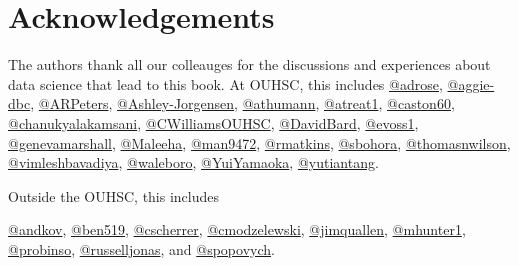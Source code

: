 \documentclass[
]{book}
\begin{document}
\hypertarget{acknowledgements}{%
\chapter{Acknowledgements}\label{acknowledgements}}

The authors thank all our colleauges for the discussions and experiences about data science that lead to this book. At OUHSC, this includes
\href{https://github.com/adrose}{@adrose},
\href{https://github.com/aggie-dbc}{@aggie-dbc},
\href{https://github.com/ARPeters}{@ARPeters},
\href{https://github.com/Ashley-Jorgensen}{@Ashley-Jorgensen},
\href{https://github.com/athumann}{@athumann},
\href{https://github.com/atreat1}{@atreat1},
\href{https://github.com/caston60}{@caston60},
\href{https://github.com/chanukyalakamsani}{@chanukyalakamsani},
\href{https://github.com/CWilliamsOUHSC}{@CWilliamsOUHSC},
\href{https://github.com/DavidBard}{@DavidBard},
\href{https://github.com/evoss1}{@evoss1},
\href{https://github.com/genevamarshall}{@genevamarshall},
\href{https://github.com/Maleeha}{@Maleeha},
\href{https://github.com/man9472}{@man9472},
\href{https://github.com/rmatkins}{@rmatkins},
\href{https://github.com/sbohora}{@sbohora},
\href{https://github.com/thomasnwilson}{@thomasnwilson},
\href{https://github.com/vimleshbavadiya}{@vimleshbavadiya},
\href{https://github.com/waleboro}{@waleboro},
\href{https://github.com/YuiYamaoka}{@YuiYamaoka},
\href{https://github.com/yutiantang}{@yutiantang}.

Outside the OUHSC, this includes

\href{https://github.com/andkov}{@andkov},
\href{https://github.com/ben519}{@ben519},
\href{https://github.com/cscherrer}{@cscherrer},
\href{https://github.com/cmodzelewski}{@cmodzelewski},
\href{https://github.com/jimquallen}{@jimquallen},
\href{https://github.com/mhunter1}{@mhunter1},
\href{https://github.com/probinso}{@probinso},
\href{https://github.com/russelljonas}{@russelljonas}, and
\href{https://github.com/spopovych}{@spopovych}.

  
\end{document}
